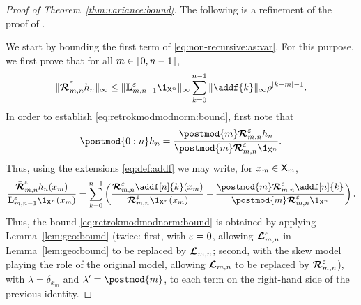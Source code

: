 \begin{proof}[Proof of Theorem~\ref{thm:variance:bound}]
The following is a refinement of the proof of \cite[Proposition~7]{olsson:westerborn:2017}. 

We start by bounding the first term of \eqref{eq:non-recursive:as:var}. For this purpose, we first prove that for all $m \in \llbracket 0, n - 1 \rrbracket$, 
\begin{equation} \label{eq:retrokmodmodnorm:bound}
\|\retrokmodmodnorm_{m, n} h_n \|_\infty \leq \| \ukmod{m, n - 1} \1_{\Xset^n} \|_\infty \sum_{k = 0}^{n - 1} \|\addf{k} \|_\infty \rho^{|k - m| - 1}. 
\end{equation}
In order to establish \eqref{eq:retrokmodmodnorm:bound}, first note that  
\begin{equation} \label{eq:post:retrok:id}
\postmod{0:n} h_n = \frac{\postmod{m} \retrokmodmod_{m, n} h_n}{\postmod{m} \retrokmodmod_{m, n} \1_{\Xset^n}}.  
\end{equation}
Thus, using the extensions \eqref{eq:def:addf} we may write, for $x_m \in \mathsf{X}_m$, 
$$
\frac{\retrokmodmodnorm_{m, n} h_n(x_m)}{\ukmod{m, n - 1} \1_{\Xset^n}(x_m)} = \sum_{k = 0}^{n - 1} \left( \frac{\retrokmodmod_{m, n} \addf[n]{k}(x_m)}{\retrokmodmod_{m, n} \1_{\Xset^n}(x_m)} - \frac{\postmod{m} \retrokmodmod_{m, n} \addf[n]{k}}{\postmod{m} \retrokmodmod_{m, n} \1_{\Xset^n}} \right). 
$$
Thus, the bound \eqref{eq:retrokmodmodnorm:bound} is obtained by applying Lemma~\ref{lem:geo:bound} (twice: first, with $\varepsilon = 0$, allowing $\boldsymbol{\mathcal{L}}^\varepsilon_{m, n}$ in Lemma~\ref{lem:geo:bound} to be replaced by $\boldsymbol{\mathcal{L}}_{m, n}$; second, with the skew model playing the role of the original model, allowing $\boldsymbol{\mathcal{L}}_{m, n}$ to be replaced by $\boldsymbol{\mathcal{R}}^\varepsilon_{m, n}$), with $\lambda = \delta_{x_m}$ and $\lambda' = \postmod{m}$, to each term on the right-hand side of the previous identity. 


\end{proof}
